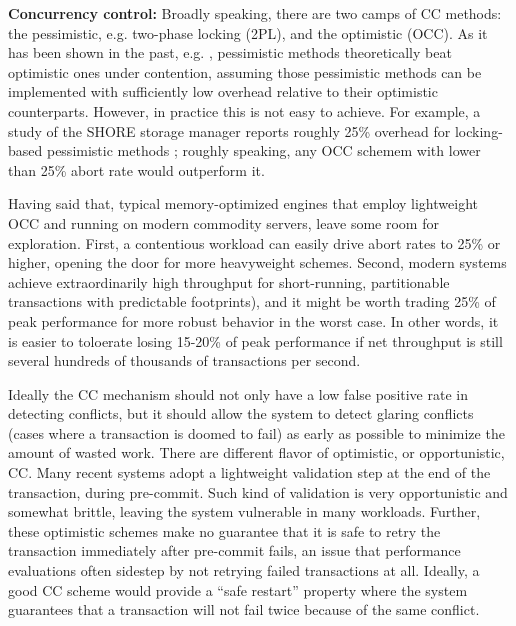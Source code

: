 \vspace{2mm} 
{\bf Concurrency control:} 
Broadly speaking, there are two camps of CC methods: the pessimistic, e.g. two-phase locking (2PL), and the optimistic (OCC). As it has been shown in the past, e.g. \cite{AgrawalCL87}, pessimistic methods theoretically beat optimistic ones under contention, assuming those pessimistic methods can be implemented with sufficiently low overhead relative to their optimistic counterparts. However, in practice this is not easy to achieve. For example, a study of the SHORE storage manager reports roughly 25\% overhead for locking-based pessimistic methods \cite{HarizopoulosAMS08}; roughly speaking, any OCC schemem with lower than 25\% abort rate would outperform it.

Having said that, typical memory-optimized engines that employ lightweight OCC and running on modern commodity servers, leave some room for exploration. First, a contentious workload can easily drive abort rates to 25\% or higher, opening the door for more heavyweight schemes. Second, modern systems achieve extraordinarily high throughput for short-running, partitionable transactions with predictable footprints), and it might be worth trading 25\% of peak performance for more robust behavior in the worst case. In other words, it is easier to toloerate losing 15-20\% of peak performance if net throughput is still several hundreds of thousands of transactions per second.


Ideally the CC mechanism should not only have a low false positive rate in detecting conflicts, but it should allow the system to detect glaring conflicts (cases where a transaction is doomed to fail) as early as possible to minimize the amount of wasted work.
There are different flavor of optimistic, or opportunistic, CC. Many recent systems adopt a lightweight validation step at the end of the transaction, during pre-commit. Such kind of validation is very opportunistic and somewhat brittle, leaving the system vulnerable in many workloads. Further, these optimistic schemes make no guarantee that it is safe to retry the transaction immediately after pre-commit fails, an issue that performance evaluations often sidestep by not retrying failed transactions at all. Ideally, a good CC scheme would provide a ``safe restart'' property \cite{PortsG12} where the system guarantees that a transaction will not fail twice because of the same conflict.

